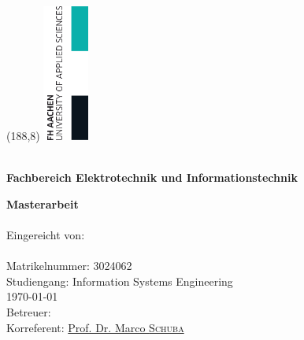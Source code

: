 \thispagestyle{empty}%
\setlength{\oddsidemargin}{0cm}%
\enlargethispage{\baselineskip}
\begin{textblock}{16}(188,8)%
    \includegraphics[width=1.5cm]{Figures/fh_logo_rechts.png}%
\end{textblock}%
\vspace*{-1.0cm}
\noindent
\LARGE\textbf{\univname}\\
\Large\textbf{Fachbereich Elektrotechnik und Informationstechnik}\\
\vspace{2cm}
\begin{center}
	\LARGE\textbf{Masterarbeit}\\
	\vspace{1.75cm}
	\LARGE \ttitle\\
	\large
	\vspace{2.5cm}
	Eingereicht von:\\
	{\authorname}\\
	Matrikelnummer: 3024062\\
	\vspace{1.5cm}
	Studiengang: Information Systems Engineering\\
	\vspace{1.5cm}
	\today\\
	\vspace{2cm}
	Betreuer: \href{https://www.fh-aachen.de/menschen/hoever/}{\supname}\\
	Korreferent: \href{https://www.fh-aachen.de/menschen/schuba/}{Prof. Dr. Marco \textsc{Schuba}}
\end{center}